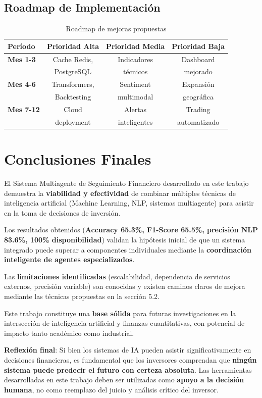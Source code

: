 \documentclass[12pt,a4paper]{report}
\begin{document}
\subsection{Roadmap de Implementación}

\begin{table}[H]
\centering
\caption{Roadmap de mejoras propuestas}
\label{tab:roadmap}
\begin{tabular}{lccc}
\toprule
\textbf{Período} & \textbf{Prioridad Alta} & \textbf{Prioridad Media} & \textbf{Prioridad Baja} \\
\midrule
\textbf{Mes 1-3} & Cache Redis, & Indicadores & Dashboard \\
 & PostgreSQL & técnicos & mejorado \\
\midrule
\textbf{Mes 4-6} & Transformers, & Sentiment & Expansión \\
 & Backtesting & multimodal & geográfica \\
\midrule
\textbf{Mes 7-12} & Cloud & Alertas & Trading \\
 & deployment & inteligentes & automatizado \\
\bottomrule
\end{tabular}
\end{table}

\section{Conclusiones Finales}

El Sistema Multiagente de Seguimiento Financiero desarrollado en este trabajo demuestra la \textbf{viabilidad y efectividad} de combinar múltiples técnicas de inteligencia artificial (Machine Learning, NLP, sistemas multiagente) para asistir en la toma de decisiones de inversión.

Los resultados obtenidos (\textbf{Accuracy 65.3\%, F1-Score 65.5\%, precisión NLP 83.6\%, 100\% disponibilidad}) validan la hipótesis inicial de que un sistema integrado puede superar a componentes individuales mediante la \textbf{coordinación inteligente de agentes especializados}.

Las \textbf{limitaciones identificadas} (escalabilidad, dependencia de servicios externos, precisión variable) son conocidas y existen caminos claros de mejora mediante las técnicas propuestas en la sección 5.2.

Este trabajo constituye una \textbf{base sólida} para futuras investigaciones en la intersección de inteligencia artificial y finanzas cuantitativas, con potencial de impacto tanto académico como industrial.

\vspace{1cm}

\textbf{Reflexión final}: Si bien los sistemas de IA pueden asistir significativamente en decisiones financieras, es fundamental que los inversores comprendan que \textbf{ningún sistema puede predecir el futuro con certeza absoluta}. Las herramientas desarrolladas en este trabajo deben ser utilizadas como \textbf{apoyo a la decisión humana}, no como reemplazo del juicio y análisis crítico del inversor.

\appendix

\end{document}
